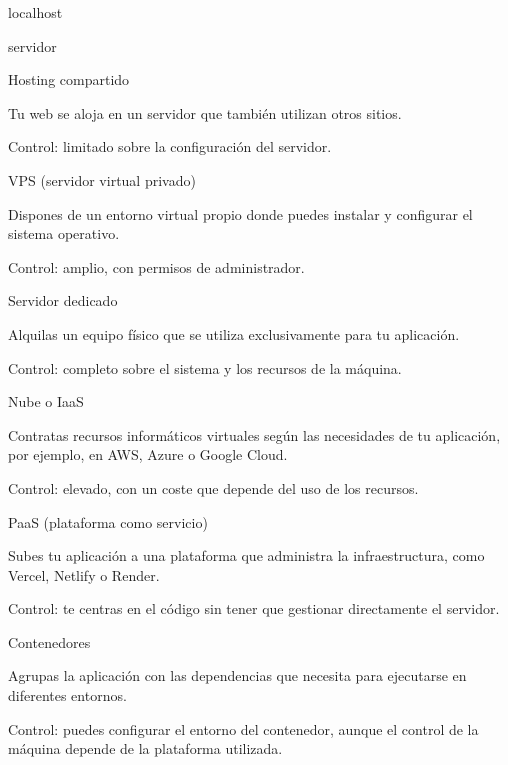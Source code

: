 \documentclass[11pt,a4paper]{extarticle}
\begin{document}
\paletaOceano
{}
\usarfondo


       {localhost}
{

       
  }
  {servidor}
  {
}




       {Hosting compartido}
{
       Tu web se aloja en un servidor que también utilizan otros sitios.

       Control: limitado sobre la configuración del servidor.
}

       {VPS (servidor virtual privado)}
{
       Dispones de un entorno virtual propio donde puedes instalar y configurar el sistema operativo.

       Control: amplio, con permisos de administrador.
}

       {Servidor dedicado}
{
       Alquilas un equipo físico que se utiliza exclusivamente para tu aplicación.

       Control: completo sobre el sistema y los recursos de la máquina.
}

       {Nube o IaaS}
{
       Contratas recursos informáticos virtuales según las necesidades de tu aplicación, por ejemplo, en AWS, Azure o Google Cloud.

       Control: elevado, con un coste que depende del uso de los recursos.
}

       {PaaS (plataforma como servicio)}
{
       Subes tu aplicación a una plataforma que administra la infraestructura, como Vercel, Netlify o Render.

       Control: te centras en el código sin tener que gestionar directamente el servidor.
}

       {Contenedores}
{
       Agrupas la aplicación con las dependencias que necesita para ejecutarse en diferentes entornos.

       Control: puedes configurar el entorno del contenedor, aunque el control de la máquina depende de la plataforma utilizada.
}

\vspace{3mm}

\end{document}
